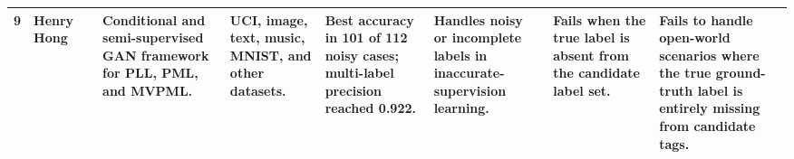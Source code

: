 \documentclass[12pt,a4paper]{article}
\begin{document}
\begin{table}[H]
{\begin{tabular}{|c|p{2.5cm}|p{3cm}|p{3.5cm}|p{2.5cm}|p{3.5cm}|p{3cm}|p{3cm}|p{3cm}|}
9 & Henry Hong & \parencite{zhang2023inaccurate} & Conditional and semi-supervised GAN framework for PLL, PML, and MVPML. & UCI, image, text, music, MNIST, and other datasets. & Best accuracy in 101 of 112 noisy cases; multi-label precision reached 0.922. & Handles noisy or incomplete labels in inaccurate-supervision learning. & Fails when the true label is absent from the candidate label set. & Fails to handle open-world scenarios where the true ground-truth label is entirely missing from candidate tags. 
\\
\hline

\end{tabular}%
}

\end{table}
\end{document}

